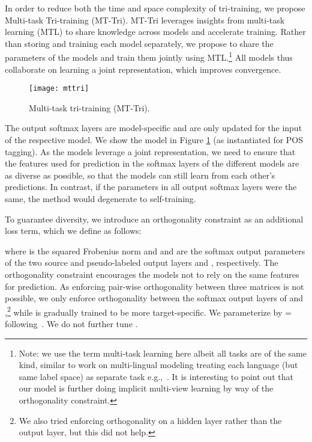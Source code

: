 \documentclass[11pt,a4paper]{article}
\begin{document}
In order to reduce both the time and space complexity of tri-training, we propose Multi-task Tri-training (MT-Tri). MT-Tri leverages insights from multi-task learning (MTL) \cite{Caruana1993} to share knowledge across models and accelerate training. Rather than storing and training each model separately, we propose to share the parameters of the models and train them jointly using MTL.\footnote{Note: we use the term multi-task learning here albeit all tasks are of the same kind, similar to work on multi-lingual modeling treating each language (but same label space) as separate task e.g.,~\cite{fang2017model}. It is interesting to point out that our model is  further doing implicit multi-view learning by way of the orthogonality constraint.} All models thus collaborate on learning a joint representation, which improves convergence. 

\begin{figure}[]\centering
\texttt{[image: mttri]}
\caption{Multi-task tri-training (MT-Tri).}
\label{fig:model}
\end{figure}

The output softmax layers are model-specific and are only updated for the input of the respective model. We show the model in Figure \ref{fig:model} (as instantiated for POS tagging). As the models leverage a joint representation, we need to ensure that the features used for prediction in the softmax layers of the different models are as diverse as possible, so that the models can still learn from each other's predictions. In contrast, if the parameters in all output softmax layers were the same, the method would degenerate to self-training.

To guarantee diversity, we introduce an orthogonality constraint \cite{Bousmalis2016} as an additional loss term, which we define as follows:



where  is the squared Frobenius norm and  and  are the softmax output parameters of the two source and pseudo-labeled output layers  and , respectively. The orthogonality constraint encourages the models not to rely on the same features for prediction. As enforcing pair-wise orthogonality between three matrices is not possible, we only enforce orthogonality between the softmax output layers of  and ,\footnote{We also tried enforcing orthogonality on a hidden layer rather than the output layer, but this did not help.} while  is gradually trained to be more target-specific. We parameterize  by = following~\cite{Liu:ea:2017:ACL}. We do not further tune .
\end{document}
